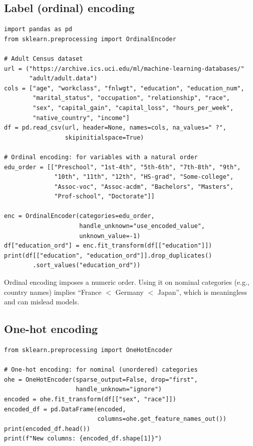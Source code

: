 \subsection{Label (ordinal) encoding}

\begin{verbatim}
import pandas as pd
from sklearn.preprocessing import OrdinalEncoder

# Adult Census dataset
url = ("https://archive.ics.uci.edu/ml/machine-learning-databases/"
       "adult/adult.data")
cols = ["age", "workclass", "fnlwgt", "education", "education_num",
        "marital_status", "occupation", "relationship", "race",
        "sex", "capital_gain", "capital_loss", "hours_per_week",
        "native_country", "income"]
df = pd.read_csv(url, header=None, names=cols, na_values=" ?",
                 skipinitialspace=True)

# Ordinal encoding: for variables with a natural order
edu_order = [["Preschool", "1st-4th", "5th-6th", "7th-8th", "9th",
              "10th", "11th", "12th", "HS-grad", "Some-college",
              "Assoc-voc", "Assoc-acdm", "Bachelors", "Masters",
              "Prof-school", "Doctorate"]]

enc = OrdinalEncoder(categories=edu_order,
                     handle_unknown="use_encoded_value",
                     unknown_value=-1)
df["education_ord"] = enc.fit_transform(df[["education"]])
print(df[["education", "education_ord"]].drop_duplicates()
        .sort_values("education_ord"))
\end{verbatim}

\begin{warningbox}
Ordinal encoding imposes a numeric order. Using it on nominal categories (e.g., country names) implies ``France $<$ Germany $<$ Japan'', which is meaningless and can mislead models.
\end{warningbox}

\subsection{One-hot encoding}

\begin{verbatim}
from sklearn.preprocessing import OneHotEncoder

# One-hot encoding: for nominal (unordered) categories
ohe = OneHotEncoder(sparse_output=False, drop="first",
                    handle_unknown="ignore")
encoded = ohe.fit_transform(df[["sex", "race"]])
encoded_df = pd.DataFrame(encoded,
                          columns=ohe.get_feature_names_out())
print(encoded_df.head())
print(f"New columns: {encoded_df.shape[1]}")
\end{verbatim}


